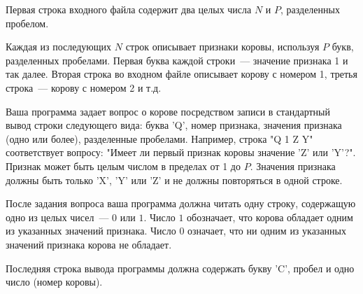 Первая строка входного файла содержит два целых числа $N$ и $P$, разделенных пробелом.

Каждая из последующих $N$ строк описывает признаки коровы, используя $P$ букв, разделенных пробелами. Первая буква каждой строки~--- значение признака 1 и так далее. Вторая строка во входном файле описывает корову с номером 1, третья строка~--- корову с номером 2 и т.д.

Ваша программа задает вопрос о корове посредством записи в стандартный вывод
строки следующего вида: буква 'Q', номер признака, значения признака (одно или
более), разделенные пробелами. Например, строка "Q 1 Z Y" соответствует
вопросу: "Имеет ли первый признак коровы значение 'Z' или 'Y'?". Признак может быть целым числом в пределах от 1 до $P$. Значения признака должны быть только
'X', 'Y' или 'Z' и не должны повторяться в одной строке. 

После задания вопроса ваша программа должна читать одну строку, содержащую
одно из целых чисел~--- $0$ или $1$. Число $1$ обозначает, что корова обладает одним из
указанных значений признака. Число $0$ означает, что ни одним из указанных
значений признака корова не обладает.

Последняя строка вывода программы должна содержать букву 'C', пробел и одно
число (номер коровы). 
